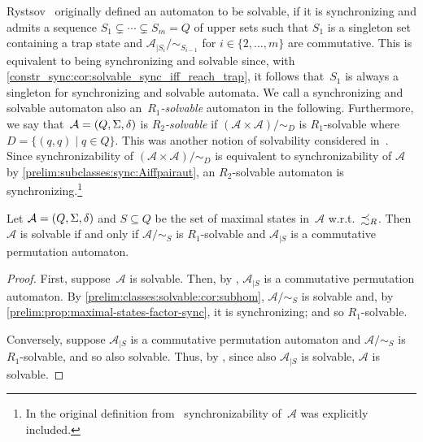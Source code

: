 Rystsov~\cite{Rys96} originally defined an automaton to be solvable, if
it is synchronizing and admits a sequence $S_1 \subsetneq \cdots \subsetneq S_m = Q$ 
of upper sets such that $S_1$ is a singleton set 
containing a trap state and $\mathcal A_{|S_i} / {\sim_{S_{i-1}}}$ for $i \in \{2,\ldots,m\}$ are commutative. 
This is equivalent to being synchronizing and solvable
since, with \cref{constr_sync:cor:solvable_sync_iff_reach_trap}, it follows that~$S_1$ is always a singleton 
for synchronizing and solvable automata.
We call a synchronizing and solvable automaton
also an~\emph{$R_1$-solvable} automaton in the following.
Furthermore, we say that~$\mathcal A = (Q, \Sigma, \delta)$
is \emph{$R_2$-solvable} if $(\mathcal A \times \mathcal A) / {\sim_D}$
is $R_1$-solvable where $D = \{(q,q) \mid q \in Q\}$. This was
another notion of solvability considered in~\cite{Rys96}.
Since synchronizability of $(\mathcal A \times \mathcal A) / {\sim_D}$
is equivalent to synchronizability of $\mathcal A$ by \cref{prelim:subclasses:sync:Aiffpairaut},
an $R_2$-solvable automaton is synchronizing.\footnote{In the original
	definition from~\cite[p.~277]{Rys96} 
	synchronizability of~$\mathcal A$ was explicitly included.}
	
\begin{proposition} \label{prelim:classes:solvable:prop:R1}
	Let $\mathcal A = (Q, \Sigma, \delta)$
	and $S \subseteq Q$ be the set of maximal states in~$\mathcal A$ w.r.t.~$\precsim_R$.
	Then $\mathcal A$ is solvable if and only if $\mathcal A / {\sim_S}$
	is $R_1$-solvable and $\mathcal A_{|S}$ is a commutative permutation automaton.
\end{proposition}
\begin{proof}
	First, suppose~$\mathcal A$ is solvable.
	Then, by , 
	$\mathcal A_{|S}$ is a commutative permutation automaton. 
	By \cref{prelim:classes:solvable:cor:subhom}, $\mathcal A / {\sim_S}$
	is solvable and, by \cref{prelim:prop:maximal-states-factor-sync}, 
	it is synchronizing; and so $R_1$-solvable.
	
	Conversely, suppose $\mathcal A_{|S}$ is a commutative permutation automaton
	and	$\mathcal A / {\sim_S}$ is $R_1$-solvable, and so also solvable.
	Thus, by , 
	since also $\mathcal A_{|S}$ is solvable, $\mathcal A$ is solvable.	
\end{proof}

